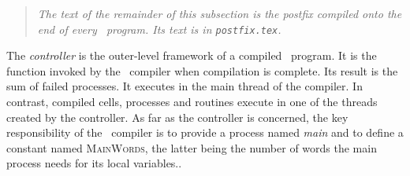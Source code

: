 \begin{quotation}
\noindent\textsl{The text of the remainder of this subsection is the postfix compiled onto the end of every \desi\ program. Its text is in \texttt{postfix.tex}.}
\end{quotation}

The \emph{controller} is the outer-level framework of a compiled \desi\ program. It is the function invoked by the \jit\ compiler when compilation is complete. Its result is the sum of failed processes. It executes in the main thread of the compiler. In contrast, compiled cells, processes and routines execute in one of the threads created by the controller. As far as the controller is concerned, the key responsibility of the \jit\ compiler is to provide a process named \emph{main} and to define a constant named \textsc{MainWords}, the latter being the number of words the main process needs for its local variables.. 

\begin{tabbing}
\indents
{}
\fin
\end{tabbing}


